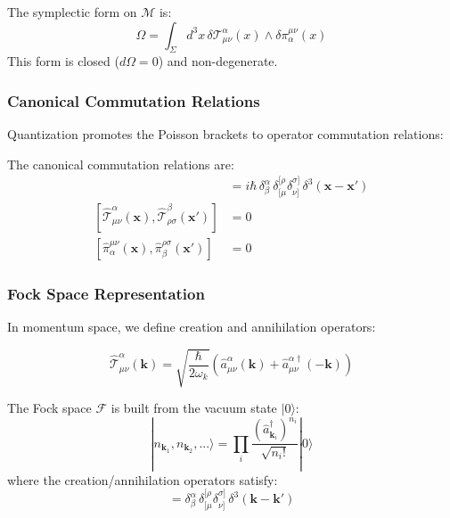 \begin{theorem}
The symplectic form on $\mathcal{M}$ is:
\begin{equation}
    \Omega = \int_\Sigma d^3x \, \delta \mathcal{T}^\alpha_{\mu\nu}(x) \wedge \delta \pi_\alpha^{\mu\nu}(x)
\end{equation}
This form is closed ($d\Omega = 0$) and non-degenerate.
\end{theorem}

\subsubsection{Canonical Commutation Relations}

Quantization promotes the Poisson brackets to operator commutation relations:

\begin{theorem}
The canonical commutation relations are:
\begin{align}
    [\hat{\mathcal{T}}^\alpha_{\mu\nu}(\mathbf{x}), \hat{\pi}_\beta^{\rho\sigma}(\mathbf{x}')] &= i\hbar \, \delta^\alpha_\beta \, \delta^{[\rho}_{[\mu} \delta^{\sigma]}_{\nu]} \, \delta^3(\mathbf{x} - \mathbf{x}') \label{eq:torsion_commutator}\\
    [\hat{\mathcal{T}}^\alpha_{\mu\nu}(\mathbf{x}), \hat{\mathcal{T}}^\beta_{\rho\sigma}(\mathbf{x}')] &= 0 \\
    [\hat{\pi}_\alpha^{\mu\nu}(\mathbf{x}), \hat{\pi}_\beta^{\rho\sigma}(\mathbf{x}')] &= 0
\end{align}
\end{theorem}

\subsubsection{Fock Space Representation}

In momentum space, we define creation and annihilation operators:

\begin{equation}
    \hat{\mathcal{T}}^\alpha_{\mu\nu}(\mathbf{k}) = \sqrt{\frac{\hbar}{2\omega_k}} \left( \hat{a}^\alpha_{\mu\nu}(\mathbf{k}) + \hat{a}^{\alpha\dagger}_{\mu\nu}(-\mathbf{k}) \right)
\end{equation}

\begin{theorem}
The Fock space $\mathcal{F}$ is built from the vacuum state $|0\rangle$:
\begin{equation}
    |n_{\mathbf{k}_1}, n_{\mathbf{k}_2}, ...\rangle = \prod_i \frac{(\hat{a}^{\dagger}_{\mathbf{k}_i})^{n_i}}{\sqrt{n_i!}} |0\rangle
\end{equation}
where the creation/annihilation operators satisfy:
\begin{equation}
    [\hat{a}^\alpha_{\mu\nu}(\mathbf{k}), \hat{a}^{\beta\dagger}_{\rho\sigma}(\mathbf{k}')] = \delta^\alpha_\beta \, \delta^{[\rho}_{[\mu} \delta^{\sigma]}_{\nu]} \, \delta^3(\mathbf{k} - \mathbf{k}')
\end{equation}
\end{theorem}

